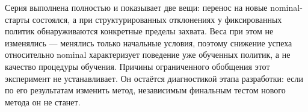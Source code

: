 Серия выполнена полностью и показывает две вещи: перенос на новые nominal-старты состоялся, а при структурированных отклонениях у фиксированных политик обнаруживаются конкретные пределы захвата. Веса при этом не изменялись — менялись только начальные условия, поэтому снижение успеха относительно nominal характеризует поведение уже обученных политик, а не качество процедуры обучения. Причины ограниченного обобщения этот эксперимент не устанавливает. Он остаётся диагностикой этапа разработки: если по его результатам изменить метод, независимым финальным тестом нового метода он не станет.
